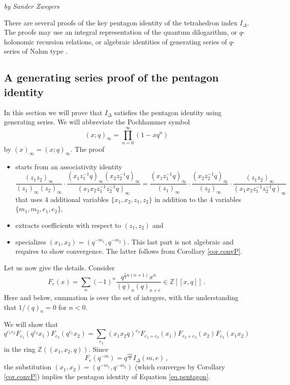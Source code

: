 \documentclass[12pt]{amsart}
\theoremstyle{definition}
\def\BZ{\mathbb Z}
\def\be{  \begin{equation} }
\def\ee{  \end{equation} }
\def\ID{I_{\Delta}}
\numberwithin{equation}{section}
\begin{document}
\centerline{\it by Sander Zwegers} \bigskip

There are several proofs of the key pentagon identity of the 
tetrahedron index $\ID$. The proofs may use
an integral representation of the quantum dilogarithm, or  
$q$-holonomic recursion relations, or algebraic identities of
generating series of $q$-series of Nahm type \cite{GL2}.

\subsection{A generating series proof of the pentagon identity}
\label{sub.genseries}

In this section we will prove that $\ID$ satisfies the pentagon
identity using generating series. We will abbreviate the Pochhammer symbol
$$
(x;q)_\infty =\prod_{n=0}^\infty (1-xq^n)
$$
by $(x)_\infty=(x;q)_\infty$. The proof 
\begin{itemize}
\item
starts from an associativity identity
$$
\frac{(z_1z_2)_\infty}{(z_1)_\infty (z_2)_\infty} \cdot
\frac{(x_1z_1^{-1}q)_\infty (x_2z_2^{-1} q)_\infty}{
(x_1 x_2 z_1^{-1}z_2^{-1}q)_\infty}=
\frac{(x_1z_1^{-1}q)_\infty}{(z_1)_\infty} \cdot
\frac{(x_2z_2^{-1}q)_\infty}{(z_2)_\infty} \cdot
\frac{(z_1z_2)_\infty}{(x_1 x_2 z_1^{-1}z_2^{-1}q)_\infty}
$$
that uses $4$ additional variables $\{x_1,x_2,z_1,z_2\}$ in addition to
the $4$ variables\newline $\{m_1,m_2,e_1,e_2\}$,
\item
extracts coefficients with respect to $(z_1,z_2)$ and 
\item
specializes $(x_1,x_2)=(q^{-m_1},q^{-m_2})$. This last part is
not algebraic and requires to show convergence. The latter follows from
Corollary \ref{cor.convP}.
\end{itemize}
Let us now give the details. Consider 
\be
\label{eq.Fex}
F_e(x)=\sum_n (-1)^n \frac{q^{\frac{1}{2}n(n+1)} x^n}{(q)_n(q)_{n+e}}
\in \BZ[[x,q]]\, .
\ee
Here and below, summation is over the set of integers, with the 
understanding that $1/(q)_n=0$ for $n < 0$. 

We will show that 
\be
\label{eq.Fgen}
q^{e_1 e_2} F_{e_1}(q^{e_2} x_1)F_{e_2}(q^{e_1} x_2)
=\sum_{e_3} (x_1 x_2 q)^{e_3} F_{e_1+e_3}(x_1) F_{e_2+e_3}(x_2) 
F_{e_3}(x_1 x_2)
\ee 
in the ring $\BZ((x_1,x_2,q))$. Since 
$$
F_e(q^{-m})=q^{\frac{e m}{2}}\ID(m,e) \,,
$$
the substitution $(x_1,x_2)=(q^{-m_1},q^{-m_2})$ (which converges by
Corollary \ref{cor.convP}) implies the pentagon identity of Equation
\ref{eq.pentagon}.
\end{document}
